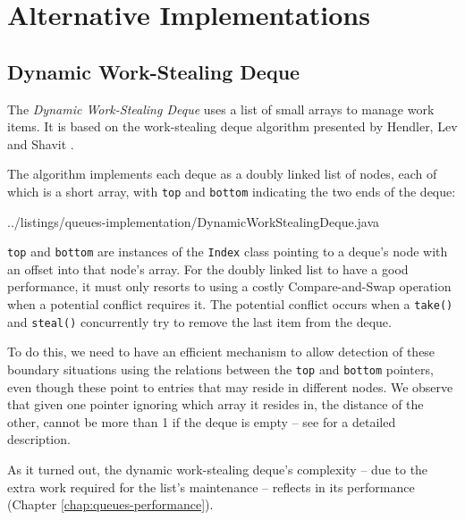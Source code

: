 


\section{Alternative Implementations}
\label{sec:queues-alternative-implementations}

\subsection{Dynamic Work-Stealing Deque}
\label{sec:queues-alternative-implementations-dynamic-deque}

The \emph{Dynamic Work-Stealing Deque} uses a list of small arrays to
manage work items. It is based on the work-stealing deque algorithm
presented by Hendler, Lev and Shavit \cite{Hendler2006, Hendler2006a}.

The algorithm implements each deque as a doubly linked list of nodes,
each of which is a short array, with \lstinline!top! and
\lstinline!bottom! indicating the two ends of the deque:


{
    ../listings/queues-implementation/DynamicWorkStealingDeque.java
}

\lstinline!top! and \lstinline!bottom! are instances of the
\lstinline!Index! class pointing to a deque's node with an offset into
that node's array. For the doubly linked list to have a good
performance, it must only resorts to using a costly Compare-and-Swap
operation when a potential conflict requires it. The potential
conflict occurs when a \lstinline!take()!  and \lstinline!steal()!
concurrently try to remove the last item from the deque.

To do this, we need to have an efficient mechanism to allow detection
of these boundary situations using the relations between the
\lstinline!top! and \lstinline!bottom! pointers, even though these
point to entries that may reside in different nodes. We observe that
given one pointer ignoring which array it resides in, the distance of
the other, cannot be more than 1 if the deque is empty -- see
\cite{Hendler2006, Hendler2006a} for a detailed description.

As it turned out, the dynamic work-stealing deque's complexity -- due
to the extra work required for the list's maintenance -- reflects in
its performance (Chapter \ref{chap:queues-performance}).

